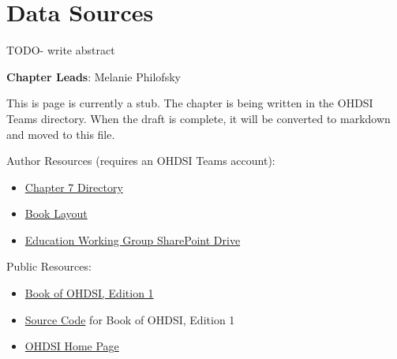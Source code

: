 \documentclass[
  letterpaper,
  paper=7in:10in,
  pagesize=pdftex,
  headinclude=on,
  footinclude=on,
  12pt]{scrbook}
\providecommand{\tightlist}{%
  \setlength{\itemsep}{0pt}\setlength{\parskip}{0pt}}\usepackage{longtable,booktabs,array}
\begin{document}
\chapter{Data Sources}\label{sec-representation-sources}

TODO- write abstract

\hfill\break

\textbf{Chapter Leads}: Melanie Philofsky

\begin{tcolorbox}[enhanced jigsaw, opacitybacktitle=0.6, coltitle=black, colback=white, bottomrule=.15mm, bottomtitle=1mm, title=\textcolor{quarto-callout-note-color}{\faInfo}\hspace{0.5em}{Note}, titlerule=0mm, rightrule=.15mm, colbacktitle=quarto-callout-note-color!10!white, colframe=quarto-callout-note-color-frame, toptitle=1mm, arc=.35mm, left=2mm, breakable, opacityback=0, leftrule=.75mm, toprule=.15mm]

This is page is currently a stub. The chapter is being written in the
OHDSI Teams directory. When the draft is complete, it will be converted
to markdown and moved to this file.

Author Resources (requires an OHDSI Teams account):

\begin{itemize}
\tightlist
\item
  \href{https://ohdsiorg.sharepoint.com/sites/Workgroup-EducationWorkingGroup/Shared\%20Documents/Forms/AllItems.aspx?id=\%2Fsites\%2FWorkgroup\%2DEducationWorkingGroup\%2FShared\%20Documents\%2FSection\%20II\%20\%2D\%20Data\%2FChapter\%207\%20\%2D\%20Data\%20Sources&viewid=05fec2cc\%2Dec8a\%2D4d04\%2Db565\%2Dcf1289b96f67}{Chapter
  7 Directory}
\item
  \href{https://ohdsiorg.sharepoint.com/:x:/r/sites/Workgroup-EducationWorkingGroup/_layouts/15/Doc2.aspx?action=edit&sourcedoc=\%7B1fa31e39-1c5f-4918-b878-609ebd9810b3\%7D&wdOrigin=TEAMS-WEB.teamsSdk_ns.rwc&wdExp=TEAMS-TREATMENT&wdhostclicktime=1748104477731&web=1}{Book
  Layout}
\item
  \href{https://ohdsiorg.sharepoint.com/sites/Workgroup-EducationWorkingGroup/Shared\%20Documents/Forms/AllItems.aspx?viewid=05fec2cc\%2Dec8a\%2D4d04\%2Db565\%2Dcf1289b96f67}{Education
  Working Group SharePoint Drive}
\end{itemize}

Public Resources:

\begin{itemize}
\tightlist
\item
  \href{https://ohdsi.github.io/TheBookOfOhdsi/}{Book of OHDSI, Edition
  1}
\item
  \href{https://github.com/OHDSI/TheBookOfOhdsi}{Source Code} for Book
  of OHDSI, Edition 1
\item
  \href{https://ohdsi.org/}{OHDSI Home Page}
\end{itemize}

\end{tcolorbox}
\end{document}
